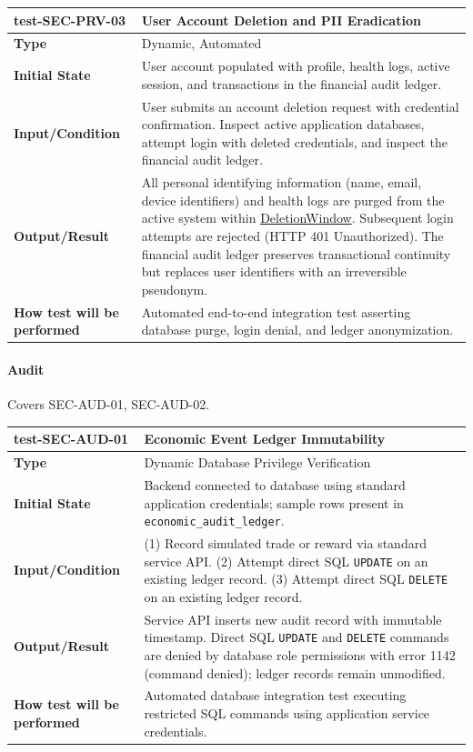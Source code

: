 \documentclass[12pt, titlepage]{article}
\newcommand{\const}[1]{\hyperlink{const:#1}{\textsf{#1}}}
\begin{document}
\vspace{1em}

\noindent\begin{tabularx}{\textwidth}{>{\raggedright\arraybackslash}p{3.5cm}X}
  \toprule
  \textbf{test-SEC-PRV-03} & \textbf{User Account Deletion and PII Eradication}\\
  \midrule
  \textbf{Type} & Dynamic, Automated\\
  \textbf{Initial State} & User account populated with profile, health logs, active session, and transactions in the financial audit ledger.\\
  \textbf{Input/Condition} & User submits an account deletion request with credential confirmation. Inspect active application databases, attempt login with deleted credentials, and inspect the financial audit ledger.\\
  \textbf{Output/Result} & All personal identifying information (name, email, device identifiers) and health logs are purged from the active system within \const{DeletionWindow}. Subsequent login attempts are rejected (HTTP 401 Unauthorized). The financial audit ledger preserves transactional continuity but replaces user identifiers with an irreversible pseudonym.\\
  \textbf{How test will be performed} & Automated end-to-end integration test asserting database purge, login denial, and ledger anonymization.\\
  \bottomrule
\end{tabularx}

\paragraph{Audit}

Covers SEC-AUD-01, SEC-AUD-02.

\noindent\begin{tabularx}{\textwidth}{>{\raggedright\arraybackslash}p{3.5cm}X}
  \toprule
  \textbf{test-SEC-AUD-01} & \textbf{Economic Event Ledger Immutability}\\
  \midrule
  \textbf{Type} & Dynamic Database Privilege Verification\\
  \textbf{Initial State} & Backend connected to database using standard application credentials; sample rows present in \texttt{economic\_audit\_ledger}.\\
  \textbf{Input/Condition} & (1) Record simulated trade or reward via standard service API. (2) Attempt direct SQL \texttt{UPDATE} on an existing ledger record. (3) Attempt direct SQL \texttt{DELETE} on an existing ledger record.\\
  \textbf{Output/Result} & Service API inserts new audit record with immutable timestamp. Direct SQL \texttt{UPDATE} and \texttt{DELETE} commands are denied by database role permissions with error 1142 (command denied); ledger records remain unmodified.\\
  \textbf{How test will be performed} & Automated database integration test executing restricted SQL commands using application service credentials.\\
  \bottomrule
\end{tabularx}
\end{document}
